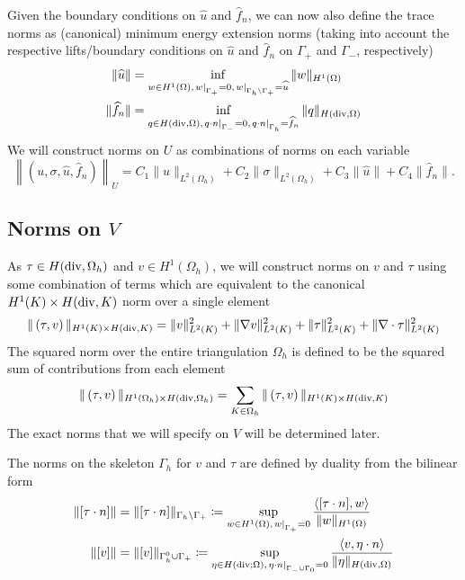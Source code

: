 \documentclass[11pt,onecolumn]{scrartcl}
\newcommand{\grad}{\nabla}
\renewcommand{\div}{\grad \cdot}
\begin{document}
Given the boundary conditions on $\widehat{u}$ and $\widehat{f}_n$, we can now also define the trace norms as (canonical) minimum energy extension norms (taking into account the respective lifts/boundary conditions on $\widehat{u}$ and $\widehat{f}_n$ on $\Gamma_+$ and $\Gamma_-$, respectively)
\begin{align*}
\|\widehat{u}\| &= \inf_{w\in H^1(\Omega), \left.w\right|_{\Gamma_+}=0, \left.w\right |_{\Gamma_h\setminus \Gamma_+ } = \widehat{u}} \|w\|_{H^1(\Omega)}\\
\|\widehat{f}_n\| &= \inf_{q\in H({\rm div},\Omega), \left.q\cdot n\right|_{\Gamma_-}= 0, \left. q\cdot n \right |_{\Gamma_h} = \widehat{f}_n} \|q\|_{H({\rm div},\Omega)}
\end{align*}
We will construct norms on $U$ as combinations of norms on each variable
\[
\left\|\left(u,\sigma,\widehat{u},\widehat{f}_n\right)\right\|_U = C_1 \|u\|_{L^2(\Omega_h)} + C_2 \|\sigma\|_{L^2(\Omega_h)} + C_3 \|\widehat{u}\| + C_4 \|\widehat{f}_n\|.
\]
\subsection{Norms on $V$}

As $\tau \in H({\rm div},\Omega_h)$ and $v \in H^1(\Omega_h)$, we will construct norms on $v$ and $\tau$ using some combination of terms which are equivalent to the canonical $H^1(K) \times H({\rm div},K)$ norm over a single element
\[
\|\left(\tau,v\right)\|_{H^1(K) \times H({\rm div},K)} = \|v\|_{L^2(K)}^2 + \|\grad v\|_{L^2(K)}^2  + \|\tau\|_{L^2(K)}^2 + \|\div \tau\|_{L^2(K)}^2
\]
The squared norm over the entire triangulation $\Omega_h$ is defined to be the squared sum of contributions from each element
\[
\|\left(\tau,v\right)\|_{H^1(\Omega_h) \times H({\rm div},\Omega_h)} = \sum_{K\in \Omega_h} \|\left(\tau,v\right)\|_{H^1(K) \times H({\rm div},K)}
\]
The exact norms that we will specify on $V$ will be determined later. 

The norms on the skeleton $\Gamma_h$ for $v$ and $\tau$ are defined by duality from the bilinear form
\begin{align*}
\|[\tau\cdot n]\| &= \|[\tau\cdot n]\|_{\Gamma_h \setminus \Gamma_+} \coloneqq \sup_{w\in H^1(\Omega), \left.w\right|_{\Gamma_+} = 0} \frac{\langle [\tau \cdot n], w\rangle}{\|w\|_{H^1(\Omega)}}\\
\|[v]\|&=\|[v]\|_{\Gamma_h^0 \cup \Gamma_+} \coloneqq \sup_{\eta\in H({\rm div};\Omega), \left.\eta\cdot n\right|_{\Gamma_- \cup \Gamma_0} = 0} \frac{\langle v, \eta\cdot n\rangle}{\|\eta\|_{H({\rm div},\Omega)}}
\end{align*}
\end{document}
